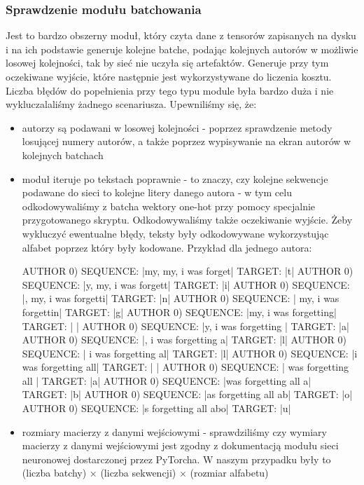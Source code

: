 \subsubsection{Sprawdzenie modułu batchowania}
	  Jest to bardzo obszerny moduł, który czyta dane z tensorów zapisanych na dysku
	  i na ich podstawie generuje kolejne batche, podając kolejnych autorów w możliwie losowej kolejności, tak by sieć
	  nie uczyła się artefaktów. Generuje przy tym oczekiwane wyjście, które następnie jest wykorzystywane do
	  liczenia kosztu. Liczba błędów do popełnienia przy tego typu module była bardzo duża i nie wykluczalaliśmy
	  żadnego scenariusza. Upewniliśmy się, że:
	\begin{itemize}
	  \item {autorzy są podawani w losowej kolejności - poprzez sprawdzenie metody losującej numery autorów,
	  a także poprzez wypisywanie na ekran autorów w kolejnych batchach}
	  \item {moduł iteruje po tekstach poprawnie - to znaczy, czy kolejne sekwencje podawane do sieci to
	  kolejne litery danego autora - w tym celu odkodowywaliśmy z batcha wektory one-hot przy pomocy
	  specjalnie przygotowanego skryptu. Odkodowywaliśmy także oczekiwanie wyjście. Żeby wykluczyć ewentualne błędy,
	  teksty były odkodowywane wykorzystując alfabet poprzez który były kodowane.
	  Przykład dla jednego autora:
\begin{bash} 
AUTHOR 0) SEQUENCE: |my, my, i was forget|     TARGET: |t|
AUTHOR 0) SEQUENCE: |y, my, i was forgett|     TARGET: |i|
AUTHOR 0) SEQUENCE: |, my, i was forgetti|     TARGET: |n|
AUTHOR 0) SEQUENCE: | my, i was forgettin|     TARGET: |g|
AUTHOR 0) SEQUENCE: |my, i was forgetting|     TARGET: | |
AUTHOR 0) SEQUENCE: |y, i was forgetting |     TARGET: |a|
AUTHOR 0) SEQUENCE: |, i was forgetting a|     TARGET: |l|
AUTHOR 0) SEQUENCE: | i was forgetting al|     TARGET: |l|
AUTHOR 0) SEQUENCE: |i was forgetting all|     TARGET: | |
AUTHOR 0) SEQUENCE: | was forgetting all |     TARGET: |a|
AUTHOR 0) SEQUENCE: |was forgetting all a|     TARGET: |b|
AUTHOR 0) SEQUENCE: |as forgetting all ab|     TARGET: |o|
AUTHOR 0) SEQUENCE: |s forgetting all abo|     TARGET: |u|
\end{bash} }
	  \item {rozmiary macierzy z danymi wejściowymi - sprawdziliśmy czy wymiary macierzy z danymi wejściowymi jest zgodny
	  z dokumentacją modułu sieci neuronowej dostarczonej przez PyTorcha. W naszym przypadku były to
	  (liczba batchy) $\times$ (liczba sekwencji) $\times$ (rozmiar alfabetu) }
	\end{itemize}


